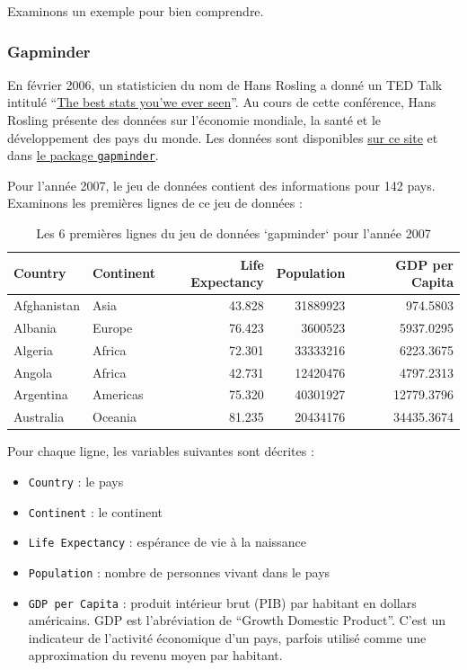\documentclass[a4paperpaper,]{article}
\providecommand{\tightlist}{%
  \setlength{\itemsep}{0pt}\setlength{\parskip}{0pt}}
\theoremstyle{definition}
\theoremstyle{definition}
\theoremstyle{definition}
\theoremstyle{remark}
\begin{document}
Examinons un exemple pour bien comprendre.

\hypertarget{gapminder}{%
\subsubsection{Gapminder}\label{gapminder}}

En février 2006, un statisticien du nom de Hans Rosling a donné un TED
Talk intitulé
``\href{https://www.ted.com/talks/hans_rosling_shows_the_best_stats_you_ve_ever_seen}{The
best stats you'we ever seen}''. Au cours de cette conférence, Hans
Rosling présente des données sur l'économie mondiale, la santé et le
développement des pays du monde. Les données sont disponibles
\href{https://www.gapminder.org/tools/\#$chart-type=bubbles}{sur ce
site} et dans
\href{https://cran.r-project.org/web/packages/gapminder/index.html}{le
package \texttt{gapminder}}.

Pour l'année 2007, le jeu de données contient des informations pour 142
pays. Examinons les premières lignes de ce jeu de données :

\begin{table}

\caption{\label{tab:unnamed-chunk-35}Les 6 premières lignes du jeu de données `gapminder` pour l'année 2007}
\centering
\begin{tabular}[t]{l|l|r|r|r}
\hline
Country & Continent & Life Expectancy & Population & GDP per Capita\\
\hline
Afghanistan & Asia & 43.828 & 31889923 & 974.5803\\
\hline
Albania & Europe & 76.423 & 3600523 & 5937.0295\\
\hline
Algeria & Africa & 72.301 & 33333216 & 6223.3675\\
\hline
Angola & Africa & 42.731 & 12420476 & 4797.2313\\
\hline
Argentina & Americas & 75.320 & 40301927 & 12779.3796\\
\hline
Australia & Oceania & 81.235 & 20434176 & 34435.3674\\
\hline
\end{tabular}
\end{table}

Pour chaque ligne, les variables suivantes sont décrites :

\begin{itemize}
\tightlist
\item
  \texttt{Country} : le pays
\item
  \texttt{Continent} : le continent
\item
  \texttt{Life\ Expectancy} : espérance de vie à la naissance
\item
  \texttt{Population} : nombre de personnes vivant dans le pays
\item
  \texttt{GDP\ per\ Capita} : produit intérieur brut (PIB) par habitant
  en dollars américains. GDP est l'abréviation de ``Growth Domestic
  Product''. C'est un indicateur de l'activité économique d'un pays,
  parfois utilisé comme une approximation du revenu moyen par habitant.
\end{itemize}
\end{document}
